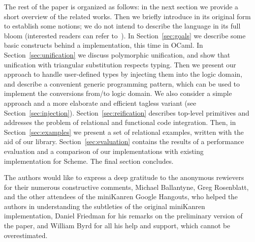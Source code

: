 The rest of the paper is organized as follows: in the next section we provide a short overview of the related
works. Then we briefly introduce \miniKanren in
its original form to establish some notions; we do not intend to describe the language in its full bloom (interested readers can
refer to~\cite{TRS}). In Section~\ref{sec:goals} we describe some basic constructs behind a \miniKanren implementation, this time
in OCaml. In Section~\ref{sec:unification} we discuss polymorphic unification, and show that unification with
triangular substitution respects typing. Then we present our approach to handle user-defined types by injecting them
into the logic domain, and describe a convenient generic programming pattern, which can be used to implement the conversions from/to logic
domain. We also consider a simple approach and a more elaborate and efficient tagless variant (see Section~\ref{sec:injection}).
Section~\ref{sec:reification} describes top-level primitives and addresses the problem of relational and functional code integration.
Then, in Section~\ref{sec:examples} we present a set of relational examples, written with the aid of our
library. Section~\ref{sec:evaluation} contains the results of a performance evaluation and a comparison of our implementations
with existing implementation for Scheme. The final section concludes.

The authors would like to express a deep gratitude to the anonymous rewievers for their numerous constructive comments, Michael Ballantyne, Greg Rosenblatt,
and the other attendees of the miniKanren Google Hangouts, who helped the authors in understanding the subtleties of the original miniKanren
implementation, Daniel Friedman for his remarks on the preliminary version of the paper, and William Byrd for all his help and support, which cannot be
overestimated.


